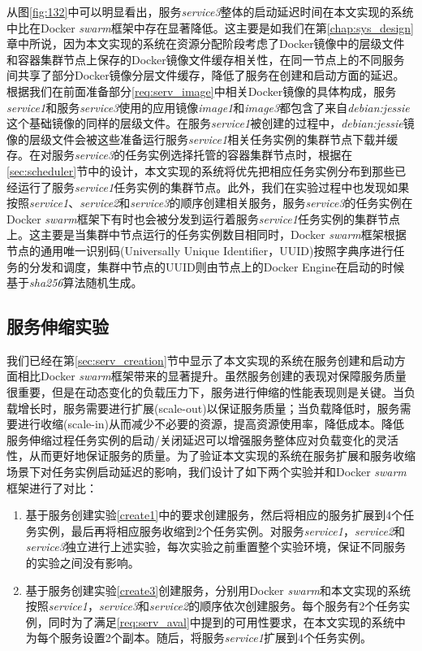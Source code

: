 从图\ref{fig:132}中可以明显看出，服务\emph{service3}整体的启动延迟时间在本文实现的系统中比在Docker \emph{swarm}框架中存在显著降低。这主要是如我们在第\ref{chap:sys_design}章中所说，因为本文实现的系统在资源分配阶段考虑了Docker镜像中的层级文件和容器集群节点上保存的Docker镜像文件缓存相关性，在同一节点上的不同服务间共享了部分Docker镜像分层文件缓存，降低了服务在创建和启动方面的延迟。根据我们在前面准备部分\ref{req:serv_image}中相关Docker镜像的具体构成，服务\emph{service1}和服务\emph{service3}使用的应用镜像\emph{image1}和\emph{image3}都包含了来自\emph{debian:jessie}这个基础镜像的同样的层级文件。在服务\emph{service1}被创建的过程中，\emph{debian:jessie}镜像的层级文件会被这些准备运行服务\emph{service1}相关任务实例的集群节点下载并缓存。在对服务\emph{service3}的任务实例选择托管的容器集群节点时，根据在\ref{sec:scheduler}节中的设计，本文实现的系统将优先把相应任务实例分布到那些已经运行了服务\emph{service1}任务实例的集群节点。此外，我们在实验过程中也发现如果按照\emph{service1}、\emph{service2}和\emph{service3}的顺序创建相关服务，服务\emph{service3}的任务实例在Docker \emph{swarm}框架下有时也会被分发到运行着服务\emph{service1}任务实例的集群节点上。这主要是当集群中节点运行的任务实例数目相同时，Docker \emph{swarm}框架根据节点的通用唯一识别码(Universally Unique Identifier，UUID)按照字典序进行任务的分发和调度，集群中节点的UUID则由节点上的Docker Engine在启动的时候基于\emph{sha256}算法随机生成。

\subsection{服务伸缩实验}\label{sec:serv_scale}
我们已经在第\ref{sec:serv_creation}节中显示了本文实现的系统在服务创建和启动方面相比Docker \emph{swarm}框架带来的显著提升。虽然服务创建的表现对保障服务质量很重要，但是在动态变化的负载压力下，服务进行伸缩的性能表现则是关键。当负载增长时，服务需要进行扩展(scale-out)以保证服务质量；当负载降低时，服务需要进行收缩(scale-in)从而减少不必要的资源，提高资源使用率，降低成本。降低服务伸缩过程任务实例的启动/关闭延迟可以增强服务整体应对负载变化的灵活性，从而更好地保证服务的质量。为了验证本文实现的系统在服务扩展和服务收缩场景下对任务实例启动延迟的影响，我们设计了如下两个实验并和Docker \emph{swarm}框架进行了对比：
\begin{enumerate}
\item\label{scale1} 基于服务创建实验\ref{create1}中的要求创建服务，然后将相应的服务扩展到4个任务实例，最后再将相应服务收缩到2个任务实例。对服务\emph{service1}，\emph{service2}和\emph{service3}独立进行上述实验，每次实验之前重置整个实验环境，保证不同服务的实验之间没有影响。
\item\label{scale2} 基于服务创建实验\ref{create3}创建服务，分别用Docker \emph{swarm}和本文实现的系统按照\emph{service1}，\emph{service3}和\emph{service2}的顺序依次创建服务。每个服务有2个任务实例，同时为了满足\ref{req:serv_aval}中提到的可用性要求，在本文实现的系统中为每个服务设置2个副本。随后，将服务\emph{service1}扩展到4个任务实例。
\end{enumerate}

